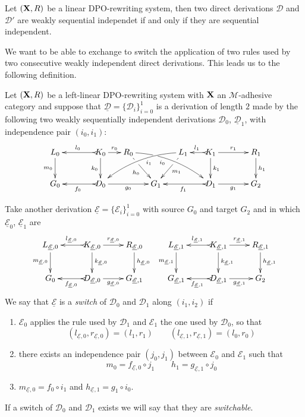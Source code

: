 \documentclass[a4paper,UKenglish,cleveref,pdftex, thm-restate,numberwithinsect]{lipics}
\def\R{\mathsf{R}}
\def\X{\textbf {\textup{X}}}
\newcommand{\dder}[1]{\mathscr{#1}}
\newcommand{\der}[1]{\underline{\dder{#1}}}
\begin{document}
	\begin{proposition}\label{rem:weak}
	Let $(\X, \R)$ be a linear DPO-rewriting system, then two direct derivations $\dder{D}$ and $\dder{D}'$ are weakly sequential independet if and only if they are sequential independent. 
\end{proposition}


We want to be able to exchange to switch the application of two rules used by two consecutive weakly independent direct derivations. This leads us to the following definition.

\begin{definition}[Switch]
  \label{de:switch}
 Let $(\X, \R)$ be a left-linear DPO-rewriting system with $\X$ an $\mathcal{M}$-adhesive category and suppose that $\der{D}=\{\dder{D}_i\}_{i=0}^1$  is a derivation of length $2$ made by the following two weakly sequentially independent derivations $\dder{D}_0$, $\der{D}_1$, with independence pair $(i_0, i_1)$:
 	\[\xymatrix@C=15pt{L_0 \ar[d]_{m_0}&& K_0 \ar[d]_{k_0}\ar@{>->}[ll]_{l_0} \ar[r]^{r_0} & R_0 \ar@/^.35cm/[drrr]|(.3)\hole_(.4){i_0} \ar[dr]|(.3)\hole_{h_0} && L_1 \ar@/_.35cm/[dlll]^(.4){i_1} \ar[dl]|(.3)\hole^{m_1}& K_1 \ar[d]^{k_1}\ar@{>->}[l]_{l_1} \ar[rr]^{r_1} && R_1 \ar[d]^{h_1}\\G_0 && \ar@{>->}[ll]^{f_0} D_0 \ar[rr]_{g_0}&& G_1  && \ar@{>->}[ll]^{f_1} D_1 \ar[rr]_{g_1}&& G_2}\]
 	
 	Take another derivation $\der{E}=\{\dder{E}_i\}_{i=0}^1$ with source $G_0$ and target $G_2$ and in which $\der{E}_0$, $\der{E}_1$ are
\[\xymatrix{L_{\der{E},0} \ar[d]_{m_{\der{E},0}}& K_{\der{E},0} \ar[d]^{k_{\der{E},0}}\ar@{>->}[l]_{l_{\der{E},0}} \ar[r]^{r_{\der{E},0}} & R_{\der{E},0} \ar[d]^{h_{\der{E},0}} & L_{\der{E},1} \ar[d]_{m_{\der{E},1}}& K_{\der{E},1} \ar[d]^{k_{\der{E},1}}\ar@{>->}[l]_{l_{\der{E},1}} \ar[r]^{r_{\der{E},1}} & R_{\der{E},1} \ar[d]^{h_{\der{E},1}}\\G_{0} & \ar@{>->}[l]^{f_{\der{E},0}} D_{\der{E},0} \ar[r]_{g_{\der{E},0}}& G_{\der{E},1} & G_{\der{E},1} & \ar@{>->}[l]^{f_{\der{E},1}} D_{\der{E},1} \ar[r]_{g_{\der{E},1}}& G_{2}}\]
 	We say that $\der{E}$ is a
 	 	 \emph{switch} of $\dder{D}_0$ and $\dder{D}_1$ along $(i_1, i_2)$ if
 	\begin{enumerate}
 		\item $\dder{E}_0$ applies the rule used by $\dder{D}_1$ and $\dder{E}_1$ the one used by $\dder{D}_0$, so that
 		\[(l_{\der{E},0}, r_{\der{E},0})=(l_1,r_1)  \qquad (l_{\der{E},1}, r_{\der{E},1})=(l_0,r_0)\]
 		\item there exists an independence pair $(j_0, j_1)$ between $\dder{E}_0$ and $\dder{E}_1$ such that
 		\[ m_0=f_{\der{E},0} \circ j_1 \qquad h_1=g_{\der{E},1} \circ j_0\]
 		\item $m_{\der{E},0}= f_0\circ i_1$ and $h_{\der{E},1}= g_{1}\circ i_0$.
 	\end{enumerate}

If a switch of $\dder{D}_0$ and $\dder{D}_1$ exists we will say that they are \emph{switchable}.
\end{definition}
\end{document}
